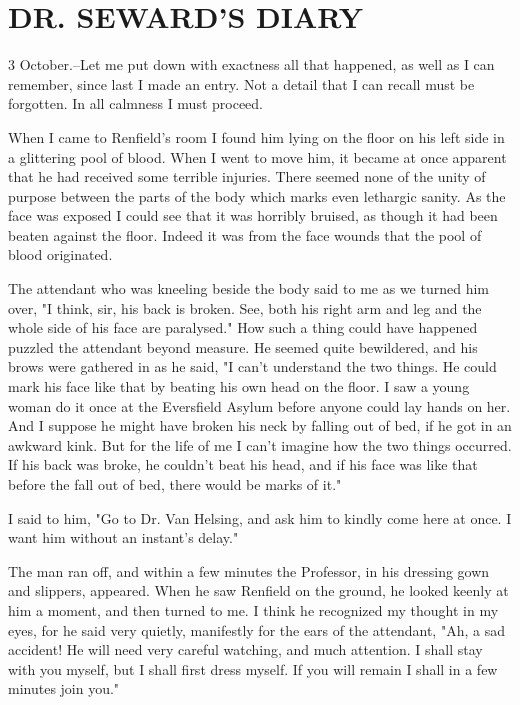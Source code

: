 \chapter{DR. SEWARD'S DIARY}

3 October.--Let me put down with exactness all that happened, as well as I can remember, since last I made an entry. Not a detail that I can recall must be forgotten. In all calmness I must proceed. 

When I came to Renfield's room I found him lying on the floor on his left side in a glittering pool of blood. When I went to move him, it became at once apparent that he had received some terrible injuries. There seemed none of the unity of purpose between the parts of the body which marks even lethargic sanity. As the face was exposed I could see that it was horribly bruised, as though it had been beaten against the floor. Indeed it was from the face wounds that the pool of blood originated. 

The attendant who was kneeling beside the body said to me as we turned him over, "I think, sir, his back is broken. See, both his right arm and leg and the whole side of his face are paralysed." How such a thing could have happened puzzled the attendant beyond measure. He seemed quite bewildered, and his brows were gathered in as he said, "I can't understand the two things. He could mark his face like that by beating his own head on the floor. I saw a young woman do it once at the Eversfield Asylum before anyone could lay hands on her. And I suppose he might have broken his neck by falling out of bed, if he got in an awkward kink. But for the life of me I can't imagine how the two things occurred. If his back was broke, he couldn't beat his head, and if his face was like that before the fall out of bed, there would be marks of it." 

I said to him, "Go to Dr. Van Helsing, and ask him to kindly come here at once. I want him without an instant's delay." 

The man ran off, and within a few minutes the Professor, in his dressing gown and slippers, appeared. When he saw Renfield on the ground, he looked keenly at him a moment, and then turned to me. I think he recognized my thought in my eyes, for he said very quietly, manifestly for the ears of the attendant, "Ah, a sad accident! He will need very careful watching, and much attention. I shall stay with you myself, but I shall first dress myself. If you will remain I shall in a few minutes join you." 


